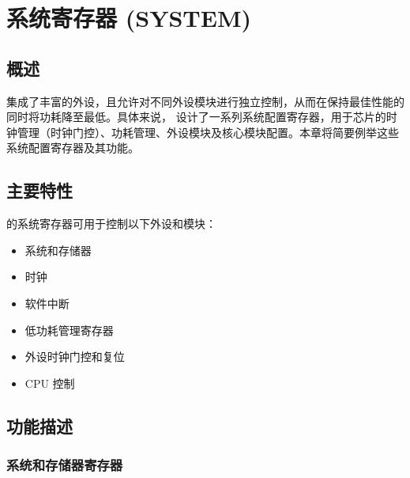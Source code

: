 \documentclass[main\_\_CN.tex]{subfiles}
\begin{document}

\ifglobal
\else
    {\let\clearpage\relax \listoftodos}
    \tableofcontents
\fi



\hypertarget{sysreg}{}
\chapter{系统寄存器 (SYSTEM)}\label{mod:sysreg}

\section{概述}

\chipname{} 集成了丰富的外设，且允许对不同外设模块进行独立控制，从而在保持最佳性能的同时将功耗降至最低。具体来说，\chipname{} 设计了一系列系统配置寄存器，用于芯片的时钟管理（时钟门控）、功耗管理、外设模块及核心模块配置。本章将简要例举这些系统配置寄存器及其功能。

\section{主要特性}

\chipname{} 的系统寄存器可用于控制以下外设和模块：

\begin{itemize}
    \item 系统和存储器
    \item 时钟
    \item 软件中断
    \item 低功耗管理寄存器
    \item 外设时钟门控和复位
    \item CPU 控制
\end{itemize}


\section{功能描述}

\subsection{系统和存储器寄存器}
\end{document}
